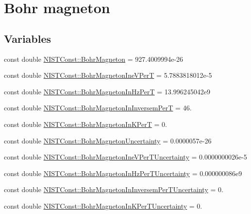 \hypertarget{group___bohr_magneton}{}\section{Bohr magneton}
\label{group___bohr_magneton}
\subsection*{Variables}
\begin{DoxyCompactItemize}
\item 
const double \hyperlink{group___bohr_magneton_gaace59be8951a23257cedcbef8f320c66}{N\+I\+S\+T\+Const\+::\+Bohr\+Magneton} = 927.\+4009994e-\/26
\item 
const double \hyperlink{group___bohr_magneton_ga8b97d10b13a2c5de4f0d268370bc3c50}{N\+I\+S\+T\+Const\+::\+Bohr\+Magneton\+Ine\+V\+PerT} = 5.\+7883818012e-\/5
\item 
const double \hyperlink{group___bohr_magneton_ga0c3cc268d0e1abc4703ea8f2c11ccab8}{N\+I\+S\+T\+Const\+::\+Bohr\+Magneton\+In\+Hz\+PerT} = 13.\+996245042e9
\item 
const double \hyperlink{group___bohr_magneton_ga934ba6e90d5c57948d11224640830e86}{N\+I\+S\+T\+Const\+::\+Bohr\+Magneton\+In\+Inversem\+PerT} = 46.
\item 
const double \hyperlink{group___bohr_magneton_ga4fcb81eff2823748ae5fced898ecc0ec}{N\+I\+S\+T\+Const\+::\+Bohr\+Magneton\+In\+K\+PerT} = 0.
\item 
const double \hyperlink{group___bohr_magneton_gaf2591aab0321fec9056cc1a8479cb05b}{N\+I\+S\+T\+Const\+::\+Bohr\+Magneton\+Uncertainty} = 0.\+0000057e-\/26
\item 
const double \hyperlink{group___bohr_magneton_gaaecd1151f7f9e12288a05ba80fb94bbd}{N\+I\+S\+T\+Const\+::\+Bohr\+Magneton\+Ine\+V\+Per\+T\+Uncertainty} = 0.\+0000000026e-\/5
\item 
const double \hyperlink{group___bohr_magneton_ga6bbb08744c1f404415a645e006c75a0b}{N\+I\+S\+T\+Const\+::\+Bohr\+Magneton\+In\+Hz\+Per\+T\+Uncertainty} = 0.\+000000086e9
\item 
const double \hyperlink{group___bohr_magneton_ga266c7d0e03078702e0f64dafd2581055}{N\+I\+S\+T\+Const\+::\+Bohr\+Magneton\+In\+Inversem\+Per\+T\+Uncertainty} = 0.
\item 
const double \hyperlink{group___bohr_magneton_ga25a3b7882df7b01e29f7d0ec090a6f91}{N\+I\+S\+T\+Const\+::\+Bohr\+Magneton\+In\+K\+Per\+T\+Uncertainty} = 0.
\item 

\end{DoxyCompactItemize}
